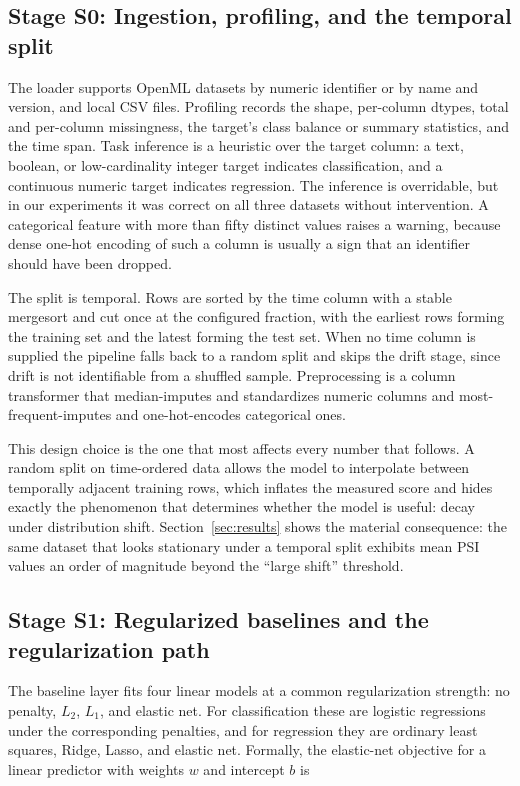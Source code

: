 \documentclass{ieeeaccess}
\begin{document}
\subsection{Stage S0: Ingestion, profiling, and the temporal split}
The loader supports OpenML datasets by numeric identifier or by name and version, and local CSV files. Profiling records the shape, per-column dtypes, total and per-column missingness, the target's class balance or summary statistics, and the time span. Task inference is a heuristic over the target column: a text, boolean, or low-cardinality integer target indicates classification, and a continuous numeric target indicates regression. The inference is overridable, but in our experiments it was correct on all three datasets without intervention. A categorical feature with more than fifty distinct values raises a warning, because dense one-hot encoding of such a column is usually a sign that an identifier should have been dropped.

The split is temporal. Rows are sorted by the time column with a stable mergesort and cut once at the configured fraction, with the earliest rows forming the training set and the latest forming the test set. When no time column is supplied the pipeline falls back to a random split and skips the drift stage, since drift is not identifiable from a shuffled sample. Preprocessing is a column transformer that median-imputes and standardizes numeric columns and most-frequent-imputes and one-hot-encodes categorical ones.

This design choice is the one that most affects every number that follows. A random split on time-ordered data allows the model to interpolate between temporally adjacent training rows, which inflates the measured score and hides exactly the phenomenon that determines whether the model is useful: decay under distribution shift. Section~\ref{sec:results} shows the material consequence: the same dataset that looks stationary under a temporal split exhibits mean PSI values an order of magnitude beyond the ``large shift'' threshold.

\subsection{Stage S1: Regularized baselines and the regularization path}
The baseline layer fits four linear models at a common regularization strength: no penalty, $L_2$, $L_1$, and elastic net. For classification these are logistic regressions under the corresponding penalties, and for regression they are ordinary least squares, Ridge, Lasso, and elastic net. Formally, the elastic-net objective for a linear predictor with weights $w$ and intercept $b$ is
\end{document}
